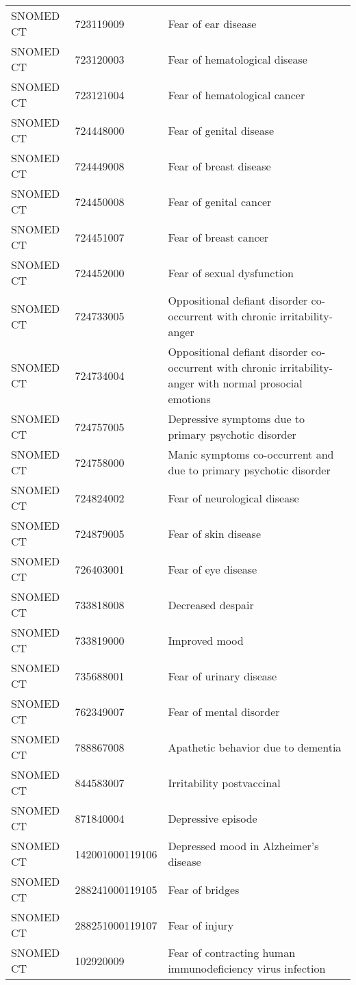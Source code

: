 \begin{longtable}{p{}p{}p{}}
  SNOMED CT & 723119009 & Fear of ear disease \\ 
  SNOMED CT & 723120003 & Fear of hematological disease \\ 
  SNOMED CT & 723121004 & Fear of hematological cancer \\ 
  SNOMED CT & 724448000 & Fear of genital disease \\ 
  SNOMED CT & 724449008 & Fear of breast disease \\ 
  SNOMED CT & 724450008 & Fear of genital cancer \\ 
  SNOMED CT & 724451007 & Fear of breast cancer \\ 
  SNOMED CT & 724452000 & Fear of sexual dysfunction \\ 
  SNOMED CT & 724733005 & Oppositional defiant disorder co-occurrent with chronic irritability-anger \\ 
  SNOMED CT & 724734004 & Oppositional defiant disorder co-occurrent with chronic irritability-anger with normal prosocial emotions \\ 
  SNOMED CT & 724757005 & Depressive symptoms due to primary psychotic disorder \\ 
  SNOMED CT & 724758000 & Manic symptoms co-occurrent and due to primary psychotic disorder \\ 
  SNOMED CT & 724824002 & Fear of neurological disease \\ 
  SNOMED CT & 724879005 & Fear of skin disease \\ 
  SNOMED CT & 726403001 & Fear of eye disease \\ 
  SNOMED CT & 733818008 & Decreased despair \\ 
  SNOMED CT & 733819000 & Improved mood \\ 
  SNOMED CT & 735688001 & Fear of urinary disease \\ 
  SNOMED CT & 762349007 & Fear of mental disorder \\ 
  SNOMED CT & 788867008 & Apathetic behavior due to dementia \\ 
  SNOMED CT & 844583007 & Irritability postvaccinal \\ 
  SNOMED CT & 871840004 & Depressive episode \\ 
  SNOMED CT & 142001000119106 & Depressed mood in Alzheimer's disease \\ 
  SNOMED CT & 288241000119105 & Fear of bridges \\ 
  SNOMED CT & 288251000119107 & Fear of injury \\ 
  SNOMED CT & 102920009 & Fear of contracting human immunodeficiency virus infection \\ 

\end{longtable}
